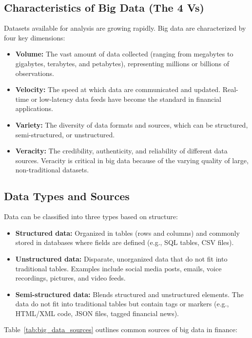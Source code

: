 \subsection{Characteristics of Big Data (The 4 Vs)}
Datasets available for analysis are growing rapidly. Big data are characterized by four key dimensions:
\begin{itemize}[noitemsep, topsep=2pt, parsep=0pt]
	\item \textbf{Volume:} The vast amount of data collected (ranging from megabytes to gigabytes, terabytes, and petabytes), representing millions or billions of observations.
	\item \textbf{Velocity:} The speed at which data are communicated and updated. Real-time or low-latency data feeds have become the standard in financial applications.
	\item \textbf{Variety:} The diversity of data formats and sources, which can be structured, semi-structured, or unstructured.
	\item \textbf{Veracity:} The credibility, authenticity, and reliability of different data sources. Veracity is critical in big data because of the varying quality of large, non-traditional datasets.
\end{itemize}

\subsection{Data Types and Sources}
Data can be classified into three types based on structure:
\begin{itemize}[noitemsep, topsep=2pt, parsep=0pt]
	\item \textbf{Structured data:} Organized in tables (rows and columns) and commonly stored in databases where fields are defined (e.g., SQL tables, CSV files).
	\item \textbf{Unstructured data:} Disparate, unorganized data that do not fit into traditional tables. Examples include social media posts, emails, voice recordings, pictures, and video feeds.
	\item \textbf{Semi-structured data:} Blends structured and unstructured elements. The data do not fit into traditional tables but contain tags or markers (e.g., HTML/XML code, JSON files, tagged financial news).
\end{itemize}

Table~\ref{tab:big_data_sources} outlines common sources of big data in finance:


